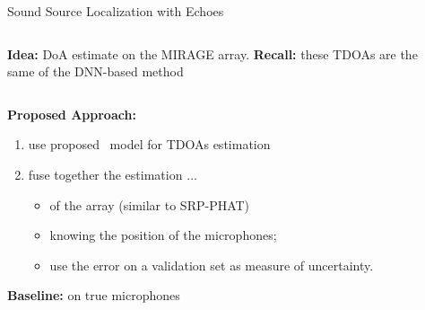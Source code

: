 \begin{frame}{Sound Source Localization \alert{with Echoes} \hfill\faMapMarked*}

    \begin{columns}[T,onlytextwidth]
    \begin{column}{0.5\textwidth}
        \begin{block}{}
                \small
                \textbf{Idea:} DoA estimate on the MIRAGE array.
                \textbf{Recall:} these TDOAs are the same of the DNN-based method
        \end{block}

    \end{column}

    \begin{column}{0.5\textwidth}
        \centering
        \end{column}
    \end{columns}


    \begin{mycontriblock}
        \textbf{Proposed Approach:}
        \begin{enumerate}
            \item use proposed \MLP~model for \alert{TDOAs} estimation
            \item fuse together the estimation $\ldots$
            \begin{itemize}
                \item of the \mirage array (similar to SRP-PHAT\footnotemark[1])
                \item knowing the position of the microphones;
                \item use the error on a validation set as measure of uncertainty.
            \end{itemize}
        \end{enumerate}
    \end{mycontriblock}

    \vspace{1mm}
    \begin{mysotablock}
        \textbf{Baseline:} \GCCPHAT on true microphones\footnotemark[2]
    \end{mysotablock}

    \vspace{1mm}

\end{frame}

